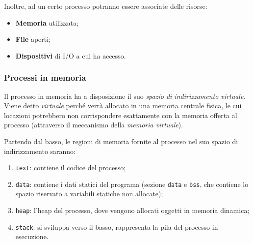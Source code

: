 \documentclass[a4paper,11pt]{article}
\begin{document}
Inoltre, ad un certo processo potranno essere associate delle risorse:
\begin{itemize}
	\item \textbf{Memoria} utilizzata;
	\item \textbf{File} aperti;
	\item \textbf{Dispositivi} di I/O a cui ha accesso.
\end{itemize}

\subsubsection{Processi in memoria}
Il processo in memoria ha a disposizione il suo \textit{spazio di indirizzamento virtuale}. 
Viene detto \textit{virtuale} perché verrà allocato in una memoria centrale fisica, le cui locazioni potrebbero non corrispondere esattamente con la memoria offerta al processo (attraverso il meccanismo della \textit{memoria virtuale}).

Partendo dal basso, le regioni di memoria fornite al processo nel suo spazio di indirizzamento saranno:
\begin{enumerate}
	\item \lstinline|text|: contiene il codice del processo;
	\item \lstinline|data|: contiene i dati statici del programa (sezione \lstinline|data| e \lstinline|bss|, che contiene lo spazio riservato a variabili statiche non allocate);
	\item \lstinline|heap|: l'heap del processo, dove vengono allocati oggetti in memoria dinamica; 
	\item \lstinline|stack|: si sviluppa verso il basso, rappresenta la pila del processo in esecuzione.
\end{enumerate}
\end{document}
